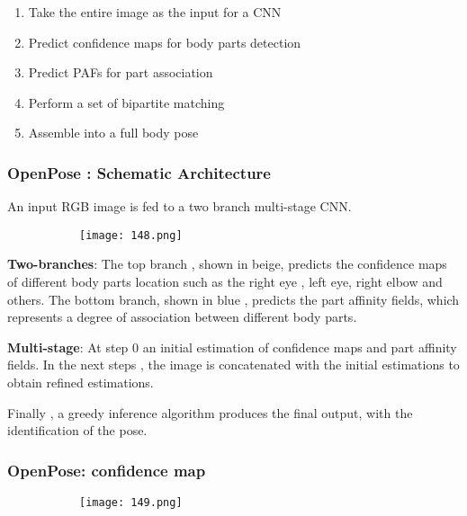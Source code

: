 \documentclass{article}
\begin{document}
\begin{enumerate}
    \item Take the entire image as the input for a CNN
    \item Predict confidence maps for body parts detection
    \item Predict PAFs for part association
    \item Perform a set of bipartite matching
    \item Assemble into a full body pose
\end{enumerate}

\subsubsection{OpenPose : Schematic Architecture}

An input RGB image is fed to a two branch multi-stage CNN.

\begin{figure}[ht!]
  \centering
  \begin{subfigure}[b]{0.9\linewidth}
    \texttt{[image: 148.png]}
  \end{subfigure}
\end{figure}

\textbf{Two-branches}: The top branch , shown in beige, predicts the confidence maps of different body parts location such as the right eye , left eye, right elbow and others. The bottom branch, shown in blue , predicts the part affinity fields, which represents a degree of association between different body parts.

\textbf{Multi-stage}: At step 0 an initial estimation of confidence maps and part affinity fields. In the next steps , the image is concatenated with the initial estimations to obtain refined estimations.

Finally , a greedy inference algorithm produces the final output, with the identification of the pose.


\subsubsection{OpenPose: confidence map}

\begin{figure}[ht!]
  \centering
  \begin{subfigure}[b]{0.7\linewidth}
    \texttt{[image: 149.png]}
  \end{subfigure}
\end{figure}
\end{document}
